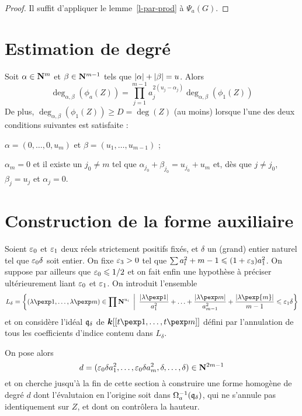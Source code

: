 \begin{proof}
  Il suffit d'appliquer le lemme~\ref{l-par-prod} à $\Psi_a(G)$.
\end{proof}

\section{Estimation de degré}

\begin{flemme}
  Soit $\alpha \in \mathbf{N}^m$ et $\beta \in \mathbf{N}^{m-1}$ tels que ${\lvert\alpha\rvert} +
  {\lvert\beta\rvert} = u$. Alors
  \[
    \deg_{\alpha, \beta}(\phi_a(Z))= \prod_{j=1}^{m-1} a_j^{2(u_j - \alpha_j)}
    \deg_{\alpha, \beta}(\phi_1(Z))
  \]
  De plus, $\deg_{\alpha, \beta}(\phi_1(Z)) \ge D = \deg(Z)$ (au moins) lorsque
  l'une des deux conditions suivantes est satisfaite :
  \begin{enumthm}
    \item $\alpha = (0, \ldots, 0, u_m)$ et $\beta = (u_1, \ldots, u_{m-1})$ ;
    \item $\alpha_m = 0$ et il existe un $j_0 \neq m$ tel que $\alpha_{j_0} +
      \beta_ {j_0} = u_{j_0} + u_m$ et, dès que $j \neq j_0$, $\beta_j = u_j$ et
      $\alpha_j = 0$.
  \end{enumthm}
\end{flemme}

\section{Construction de la forme auxiliaire}

Soient $\varepsilon_0$ et $\varepsilon_1$ deux réels strictement positifs fixés, et $\delta$
un (grand) entier naturel tel que $\varepsilon_0 \delta$ soit entier. On fixe $\varepsilon_3 >
0$ tel que $\sum a_l^2 + m -1 \leqslant (1 + \varepsilon_3) a_1^2$. On suppose par ailleurs
que $\varepsilon_0 \leqslant 1/2$ et on fait enfin une hypothèse à préciser ultérieurement
liant $\varepsilon_0$ et $\varepsilon_1$. On introduit l'ensemble
\[
  L_\delta = \left\{ (\lambda\pexp 1, \ldots, \lambda\pexp m) \in \prod \N^{u_i}
  \,\suchthat\,
  \frac{\lgr{\lambda\pexp1}}{a_1^2} + \ldots +
  \frac{\lgr{\lambda\pexp m}}{a_{m-1}^2} + \frac{\lgr{\lambda\pexp{m}}}{m-1}
  \le \eps_1 \delta \right\}
\]
et on considère l'idéal ${\mathfrak q}_\delta$ de $\cdn[[t\pexp1, \ldots, t\pexp m]]$
défini par l'annulation de tous les coefficients d'indice contenu dans
$L_\delta$.

On pose alors
\[
  d = (\varepsilon_0\delta a_1^2, \ldots, \varepsilon_0\delta a_m^2, \delta, \ldots, \delta)
  \in \mathbf{N}^{2m-1}
\]
et on cherche jusqu'à la fin de cette section à construire une forme homogène de
degré $d$ dont l'évalutaion en l'origine soit dans $\Omega_a^{-1}({\mathfrak q}_\delta)$,
qui ne s'annule pas identiquement sur $Z$, et dont on contrôlera la hauteur.

